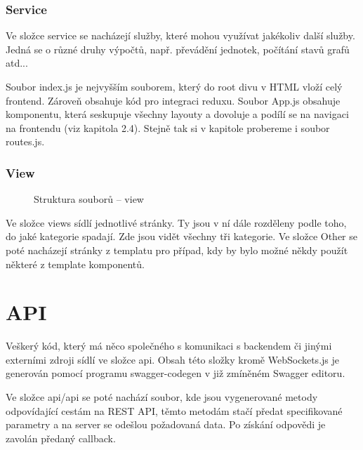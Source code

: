 \documentclass[a4paper,oneside,12pt]{report}
\begin{document}
\subsubsection{Service}


Ve složce service se nacházejí služby, které mohou využívat jakékoliv další služby.
Jedná se o různé druhy výpočtů, např. převádění jednotek, počítání stavů grafů atd...

Soubor index.js je nejvyšším souborem, který do root divu v HTML vloží celý frontend.
Zároveň obsahuje kód pro integraci reduxu.
Soubor App.js obsahuje komponentu, která seskupuje všechny layouty a dovoluje a podílí se na navigaci na frontendu (viz kapitola 2.4).
Stejně tak si v kapitole probereme i soubor routes.js.

\newpage
\subsubsection{View}

\begin{figure}[h]
	\caption[Struktura souborů -- view, vlastní tvorba]{Struktura souborů -- view}
	\label{fig:frontendStructureView}
\end{figure}

Ve složce views sídlí jednotlivé stránky.
Ty jsou v ní dále rozděleny podle toho, do jaké kategorie spadají.
Zde jsou vidět všechny tři kategorie.
Ve složce Other se poté nacházejí stránky z templatu pro případ, kdy by bylo možné někdy použít některé z template komponentů.

\section{API}

Veškerý kód, který má něco společného s komunikaci s backendem či jinými externími zdroji sídlí ve složce api. Obsah této složky kromě WebSockets.js je generován pomocí programu swagger-codegen v již zmíněném Swagger editoru.

Ve složce api/api se poté nachází soubor, kde jsou vygenerované metody odpovídající cestám na REST API, těmto metodám stačí předat specifikované parametry a na server se odešlou požadovaná data. Po získání odpovědi je zavolán předaný callback.
\end{document}
